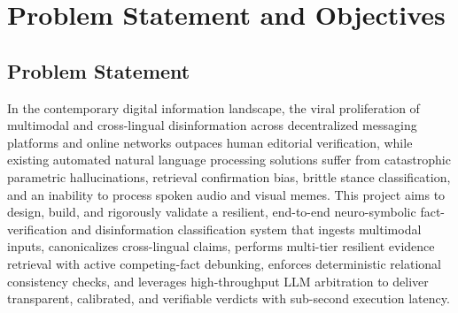 \documentclass[12pt,a4paper]{report}
\begin{document}
\chapter{Problem Statement and Objectives}

\section{Problem Statement}
In the contemporary digital information landscape, the viral proliferation of multimodal and cross-lingual disinformation across decentralized messaging platforms and online networks outpaces human editorial verification, while existing automated natural language processing solutions suffer from catastrophic parametric hallucinations, retrieval confirmation bias, brittle stance classification, and an inability to process spoken audio and visual memes. This project aims to design, build, and rigorously validate a resilient, end-to-end neuro-symbolic fact-verification and disinformation classification system that ingests multimodal inputs, canonicalizes cross-lingual claims, performs multi-tier resilient evidence retrieval with active competing-fact debunking, enforces deterministic relational consistency checks, and leverages high-throughput LLM arbitration to deliver transparent, calibrated, and verifiable verdicts with sub-second execution latency.
\end{document}
